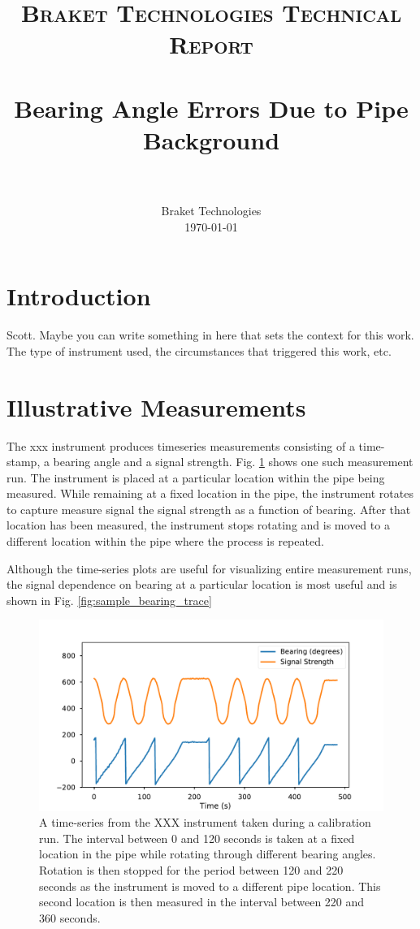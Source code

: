 \documentclass[paper=a4, fontsize=11pt]{scrartcl}
\title{
		\usefont{OT1}{bch}{b}{n}
		\normalfont \normalsize \textsc{Braket Technologies Technical Report} \\ [25pt]
		\horrule{0.5pt} \\[0.4cm]
		\huge Bearing Angle Errors Due to Pipe Background \\
		\horrule{2pt} \\[0.5cm]
}
\author{
		\normalfont 								\normalsize
        Braket Technologies\\[-3pt]		\normalsize
        \today
}
\date{}
\numberwithin{equation}{section}		%
\numberwithin{figure}{section}			%
\numberwithin{table}{section}				%
\begin{document}
\maketitle
\section{Introduction}
Scott.  Maybe you can write something in here that sets the context for this work.  The type of instrument used, the circumstances that triggered this work, etc.

\section{Illustrative Measurements}
The xxx instrument produces timeseries measurements consisting of a time-stamp, a bearing angle and a signal strength.  Fig. \ref{fig:sample_time_trace} shows one such measurement run.  The instrument is placed at a particular location within the pipe being measured.  While remaining at a fixed location in the pipe, the instrument rotates to capture measure signal the signal strength as a function of bearing.  After that location has been measured, the instrument stops rotating and is moved to a different location within the pipe where the process is repeated.

\par Although the time-series plots are useful for visualizing entire measurement runs, the signal dependence on bearing at a particular location is most useful and is shown in Fig. \ref{fig:sample_bearing_trace}


\begin{figure}[h]
  \caption{A time-series from the XXX instrument taken during a calibration run. The interval between 0 and 120 seconds is taken at a fixed location in the pipe while rotating through different bearing angles.  Rotation is then stopped for the period between 120 and 220 seconds as the instrument is moved to a different pipe location.  This second location is then measured in the interval between 220 and 360 seconds.}
  \label{fig:sample_time_trace}
  \centering
  \includegraphics[width=1.0\textwidth]{figures/sample_time_trace.pdf}
\end{figure}
\end{document}
